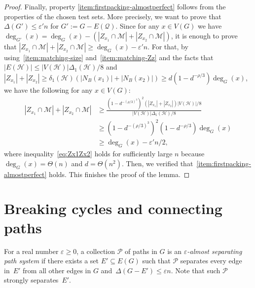\documentclass[a4paper, 11pt,reqno]{amsart}
\newcommand{\calH}{\mathcal{H}}
\newcommand{\calP}{\mathcal{P}}
\newcommand{\calQ}{\mathcal{Q}}
\theoremstyle{plain}
\theoremstyle{definition}
\numberwithin{equation}{section}
\newcommand{\eps}{\varepsilon}
\begin{document}
\begin{proof}
Finally, property \ref{item:firstpacking-almostperfect} follows from the
properties of the chosen test sets.  More precisely, we want to prove 
that $\Delta(G') \leq \eps'n$ for $G':=G-E(\calQ)$. Since for
any $x\in V(G)$ we have $\deg_{G'}(x) = \deg_G(x)- (|Z_{x_1} \cap
\mathcal{M}| + |Z_{x_2} \cap \mathcal{M}|)$, it is enough to prove
that $|Z_{x_1} \cap \mathcal{M}| + |Z_{x_2} \cap \mathcal{M}| \geq
\deg_G(x) - \eps'n$. For that, by using~\ref{item:matching-size}
and~\ref{item:matching-Zz} and the facts that $|E(\calH)| \leq
|V(\calH)|\Delta_1(\calH)/8$ and $|Z_{x_1}| +|Z_{x_2}| \geq
\delta_1(\calH)(|N_B(x_1)|+|N_B(x_2)|) \geq d(1-d^{-\rho/3})\deg_G(x)$, 
we have the following for any $x\in V(G)$:
\begin{align}
	|Z_{x_1} \cap \mathcal{M}| + |Z_{x_2} \cap \mathcal{M}|
	&\geq \frac{(1-d^{-(\rho/3)^3})^2 (|Z_{x_1}|+|Z_{x_2}|)|V(\calH)|/8}{|V(\calH)|\Delta_1(\calH)/8}\nonumber\\
&\geq (1-d^{-(\rho/3)^3})^2 (1-d^{-\rho/3})\deg_G(x)\nonumber\\
&\geq \deg_G(x) - \eps'n/2, \label{eq:Zx1Zx2}
\end{align}
where inequality~\eqref{eq:Zx1Zx2} holds for sufficiently large $n$ 
because $\deg_G(x)=\Theta(n)$ and $d=\Theta(n^2)$. Then, we verified
that~\ref{item:firstpacking-almostperfect} holds.
This finishes the proof of the lemma.
\end{proof}

\section{Breaking cycles and connecting paths} \label{section:breakingbad}
\label{sec:connecting}

For a real number $\eps \geq 0$, a collection $\calP$ of paths in $G$ is an 
\emph{$\eps$-almost separating path system} if there exists a set $E' \subseteq E(G)$ 
such that $\calP$ separates every edge in~$E'$ from all other edges in $G$ 
and~$\Delta(G-E') \leq \eps n$.
Note that such $\calP$ strongly separates~$E'$. 
\end{document}
